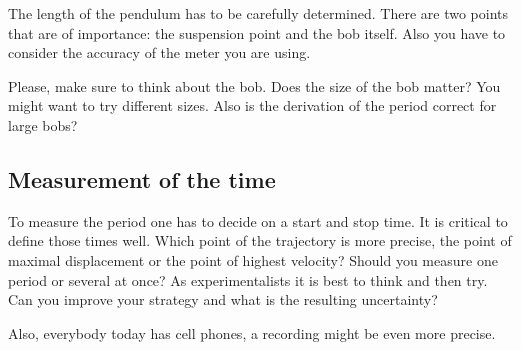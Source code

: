 \documentclass[10pt,aps,twocolumn,secnumarabic,balancelastpage,amsmath,amssymb,nofootinbib,floatfix]{revtex4}
\begin{document}
The length of the pendulum has to be carefully determined. There are two points that are of importance: the suspension point and the bob itself. Also you have to consider the accuracy of the meter you are using.

Please, make sure to think about the bob. Does the size of the bob matter? You might want to try different sizes. Also is the derivation of the period correct for large bobs?

\subsection{Measurement of the time}

To measure the period one has to decide on a start and stop time. It is critical to define those times well. Which point of the trajectory is more precise, the point of maximal displacement or the point of highest velocity? Should you measure one period or several at once? As experimentalists it is best to think and then try. Can you improve your strategy and what is the resulting uncertainty?

Also, everybody today has cell phones, a recording might be even more precise.


\end{document}
